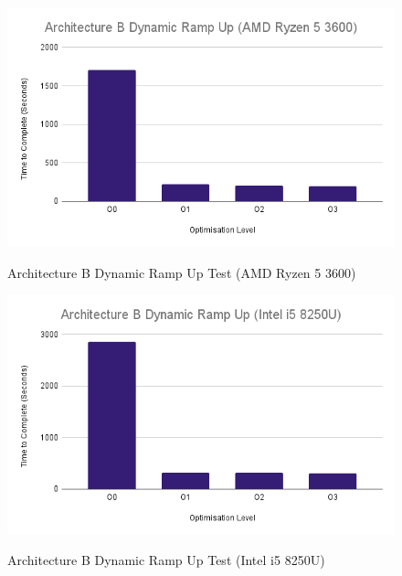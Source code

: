 \documentclass{article}
\begin{document}
\begin{figure}[!h]
\centering
\includegraphics[scale=0.5]{Architecture B Dynamic Ramp Up (AMD Ryzen 5 3600).png}
\label{arch_b_dynamic_ramp_up_pc}
\caption{Architecture B Dynamic Ramp Up Test (AMD Ryzen 5 3600)}
\end{figure}

\begin{figure}[!h]
\centering
\includegraphics[scale=0.5]{Architecture B Dynamic Ramp Up (Intel i5 8250U).png}
\label{arch_b_dynamic_ramp_up_laptop}
\caption{Architecture B Dynamic Ramp Up Test (Intel i5 8250U)}
\end{figure}

\clearpage
\end{document}
